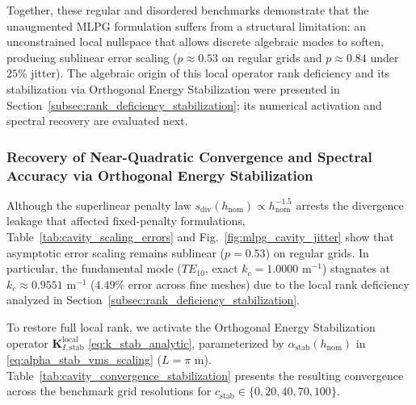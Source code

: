 \documentclass[VANCOUVER,Times1COL]{WileyNJD-v5}
\begin{document}
Together, these regular and disordered benchmarks demonstrate that the unaugmented MLPG formulation suffers from a structural limitation: an unconstrained local nullspace that allows discrete algebraic modes to soften, producing sublinear error scaling ($p \approx 0.53$ on regular grids and $p \approx 0.84$ under $25\%$ jitter). The algebraic origin of this local operator rank deficiency and its stabilization via Orthogonal Energy Stabilization were presented in Section~\ref{subsec:rank_deficiency_stabilization}; its numerical activation and spectral recovery are evaluated next.

\subsubsection{Recovery of Near-Quadratic Convergence and Spectral Accuracy via Orthogonal Energy Stabilization}
\label{subsubsec:resolution_stagnation_stabilization}

Although the superlinear penalty law $s_{\mathrm{div}}(h_{\mathrm{nom}}) \propto h_{\mathrm{nom}}^{-1.5}$ arrests the divergence leakage that affected fixed-penalty formulations, Table~\ref{tab:cavity_scaling_errors} and Fig.~\ref{fig:mlpg_cavity_jitter} show that asymptotic error scaling remains sublinear ($p = 0.53$) on regular grids. In particular, the fundamental mode ($TE_{10}$, exact $k_c = 1.0000\text{ m}^{-1}$) stagnates at $k_c \approx 0.9551\text{ m}^{-1}$ ($4.49\%$ error across fine meshes) due to the local rank deficiency analyzed in Section~\ref{subsec:rank_deficiency_stabilization}.

To restore full local rank, we activate the Orthogonal Energy Stabilization operator $\mathbf{K}_{I, \mathrm{stab}}^{\mathrm{local}}$ \eqref{eq:k_stab_analytic}, parameterized by $\alpha_{\mathrm{stab}}(h_{\mathrm{nom}})$ in \eqref{eq:alpha_stab_vms_scaling} ($L = \pi\text{ m}$). Table~\ref{tab:cavity_convergence_stabilization} presents the resulting convergence across the benchmark grid resolutions for $c_{\mathrm{stab}} \in \{0, 20, 40, 70, 100\}$.
\end{document}

